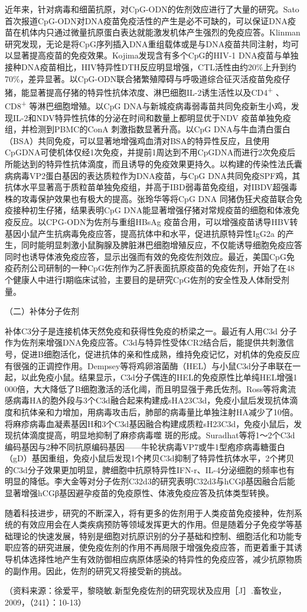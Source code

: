 近年来，针对病毒和细菌抗原，对CpG-ODN的佐剂效应进行了大量的研究。Sato首次报道CpG-ODN对DNA疫苗免疫活性的产生是必不可缺的，可以保证DNA疫苗在机体内只通过微量抗原蛋白表达就能激发机体产生强烈的免疫应答。Klinman研究发现，无论是将CpG序列插入DNA重组载体或是与DNA疫苗共同注射，均可以显著提高疫苗的免疫效果。Kojima发现含有多个CpG的HIV-1
DNA疫苗与单独接种DNA疫苗相比，HIV特异性DTH反应明显增强，CTL活性由约20\%上升到约70\%，差异显著。以CpG-ODN联合猪繁殖障碍与呼吸道综合征灭活疫苗免疫仔猪，能显著提高仔猪的特异性抗体浓度、淋巴细胞IL-2诱生活性以及CD4\textsuperscript{+}
、CD8\textsuperscript{+} 等淋巴细胞增殖。以CpG
DNA与新城疫病毒弱毒苗共同免疫新生小鸡，发现IL-2和NDV特异性抗体的分泌在时间和数量上都明显优于NDV
疫苗单独免疫组，并检测到PBMC的ConA 刺激指数显著升高。以CpG
DNA与牛血清白蛋白（BSA）共同免疫，可以显著地增强鸡血清对BSA的特异性反应，且使用CpGDNA可使机体仅经1次免疫，并提前1周达到不用CpGDNA而进行2次免疫后所能达到的特异性抗体滴度，而且诱导的免疫效果更持久。以构建的传染性法氏囊病病毒VP2蛋白基因的表达质粒作为DNA疫苗，与CpG
DNA共同免疫SPF鸡，其抗体水平显著高于质粒苗单独免疫组，并高于IBD弱毒苗免疫组，对IBDV超强毒株的攻毒保护效果也有极大的提高。张玲华等将CpG
DNA 同猪伪狂犬疫苗联合免疫接种初生仔猪，结果表明CpG
DNA能显著增强仔猪对常规疫苗的细胞和体液免疫反应。以CPG-ODN为佐剂与重组HBsAg
疫苗合用，可以增强疫苗诱导HBV转基因小鼠产生抗病毒免疫应答，提高抗体中和水平，促进抗原特异性IgG2a
的产生，同时能明显刺激小鼠胸腺及脾脏淋巴细胞增殖反应，不仅能诱导细胞免疫应答同时也诱导体液免疫应答，显示出强而有效的免疫佐剂效应。最近，美国CpG免疫药剂公司研制的一种CpG佐剂作为乙肝表面抗原疫苗的免疫佐剂，开始了在48个健康人中进行I期临床试验，主要目的是研究CpG佐剂的安全性及人体耐受剂量。

（二）补体分子佐剂

补体C3分子是连接机体天然免疫和获得性免疫的桥梁之一。最近有人用C3d
分子作为佐剂来增强DNA免疫应答。C3d与特异性受体CR2结合后，能提供共刺激信号，促进B细胞活化，促进抗体的亲和性成熟，维持免疫记忆，对机体的免疫反应有很强的正调控作用。Dempsey等将鸡卵溶菌酶（HEL）与小鼠C3d分子串联在一起，以此免疫小鼠。结果显示，C3d分子偶连的HEL的免疫原性比单纯HEL增强1
000倍，大大降低了B细胞激活的活化阈，而且明显强于弗氏佐剂。Ross等将禽流感病毒HA的胞外段与3个C3d融合起来构建成sHA23C3d，免疫小鼠后发现抗体滴度和抗体亲和力增加，用病毒攻击后，肺部的病毒量比单独注射HA减少了10倍。将麻疹病毒血凝素基因H和3个C3d基因融合构建成质粒sH23C3d，免疫小鼠后，发现抗体滴度提高，明显地抑制了麻疹病毒噬
斑的形成。Suradhat等将1～2个C3d编码基因与2种不同抗原编码基因------牛轮状病毒VP7或牛1型疱疹病毒糖蛋白（gD）基因重组，免疫小鼠后发现1个拷贝C3d抑制了特异性抗体水平，2个拷贝的C3d分子效果更加明显，脾细胞中抗原特异性IFN-r、IL-4分泌细胞的频率也有明显的降低。李大金等对分子佐剂C32d3的研究表明C32d3与hCGβ基因融合后能显著增强hCGβ基因避孕疫苗的免疫原性、体液免疫应答及抗体类型转换。

随着科技进步，研究的不断深入，将有更多的佐剂用于人类疫苗免疫接种，佐剂系统的有效应用会在人类疾病预防等领域发挥更大的作用。但是随着分子免疫学等基础理论的快速发展，特别是细胞对抗原识别的分子基础和控制、细胞活化和功能专职应答的研究进展，使免疫佐剂的作用不再局限于增强免疫应答，而更着重于其诱导机体选择性地产生有效防御相应病原体感染的特异性的免疫应答，减少抗原物质的副作用。因此，佐剂的研究又将接受新的挑战。

（资料来源：徐爱平，黎晓敏.新型免疫佐剂的研究现状及应用［J］.畜牧业，2009，（241）：10-13）

